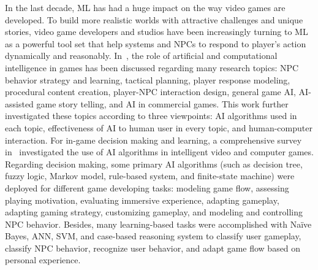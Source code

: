 \documentclass[journal]{IEEEtran}
\begin{document}
In the last decade, ML has had a huge impact on the way video games are developed. To build more realistic worlds with attractive challenges and unique stories, video game developers and studios have been increasingly turning to ML as a powerful tool set that help systems and NPCs to respond to player’s action dynamically and reasonably.
In~\cite{yannakakis2015panorama}, the role of artificial and computational intelligence in games has been discussed regarding many research topics: NPC behavior strategy and learning, tactical planning, player response modeling, procedural content creation, player-NPC interaction design, general game AI, AI-assisted game story telling, and AI in commercial games. This work further investigated these topics according to three viewpoints: AI algorithms used in each topic, effectiveness of AI to human user in every topic, and human-computer interaction.
For in-game decision making and learning, a comprehensive survey in~\cite{frutos2017review} investigated the use of AI algorithms in intelligent video and computer games. Regarding decision making, some primary AI algorithms (such as decision tree, fuzzy logic, Markov model,  rule-based system, and finite-state machine) were deployed for different game developing tasks: modeling game flow, assessing playing motivation, evaluating immersive experience, adapting gameplay, adapting gaming strategy, customizing gameplay, and modeling and controlling NPC behavior. Besides, many learning-based tasks were accomplished with Naïve Bayes, ANN, SVM, and case-based reasoning system to classify user gameplay, classify NPC behavior, recognize user behavior, and adapt game flow based on personal experience.
\end{document}
